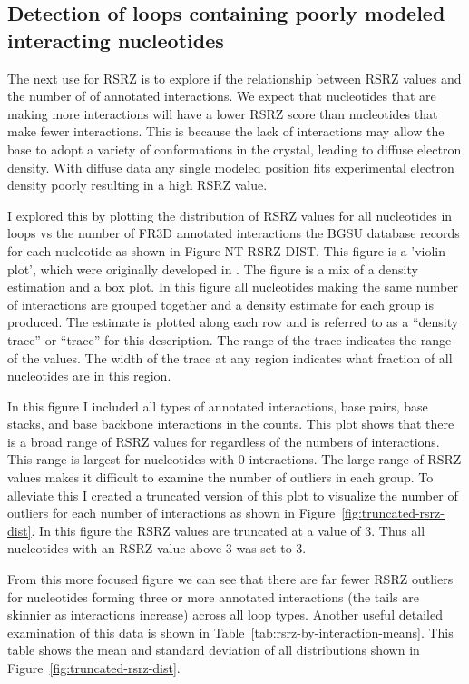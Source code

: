 \subsection{Detection of loops containing poorly modeled interacting nucleotides}

The next use for RSRZ is to explore if the relationship between RSRZ values and
the number of of annotated interactions. We expect that nucleotides that are
making more interactions will have a lower RSRZ score than nucleotides that make
fewer interactions. This is because the lack of interactions may allow the base
to adopt a variety of conformations in the crystal, leading to diffuse electron
density. With diffuse data any single modeled position fits experimental
electron density poorly resulting in a high RSRZ value.

I explored this by plotting the distribution of RSRZ values for all nucleotides
in loops vs the number of FR3D annotated interactions the BGSU database records
for each nucleotide as shown in Figure NT RSRZ DIST. This figure is a 'violin
plot', which were originally developed in \cite{Hintze1998}. The figure is a mix
of a density estimation and a box plot. In this figure all nucleotides making
the same number of interactions are grouped together and a density estimate for
each group is produced. The estimate is plotted along each row and is referred
to as a ``density trace'' or ``trace'' for this description. The range of the
trace indicates the range of the values. The width of the trace at any region
indicates what fraction of all nucleotides are in this region.

In this figure I included all types of annotated interactions, base pairs, base
stacks, and base backbone interactions in the counts. This plot shows that there
is a broad range of RSRZ values for regardless of the numbers of interactions.
This range is largest for nucleotides with 0 interactions. The large range of
RSRZ values makes it difficult to examine the number of outliers in each group. To
alleviate this I created a truncated version of this plot to visualize the
number of outliers for each number of interactions as shown in
Figure~\ref{fig:truncated-rsrz-dist}. In this figure the RSRZ values are
truncated at a value of 3. Thus all nucleotides with an RSRZ value above 3 was
set to 3.

From this more focused figure we can see that there are far fewer RSRZ outliers
for nucleotides forming three or more annotated interactions (the tails are
skinnier as interactions increase) across all loop types. Another useful
detailed examination of this data is shown in Table~\ref{tab:rsrz-by-interaction-means}.
This table shows the mean and standard deviation of all distributions shown in
Figure~\ref{fig:truncated-rsrz-dist}.

